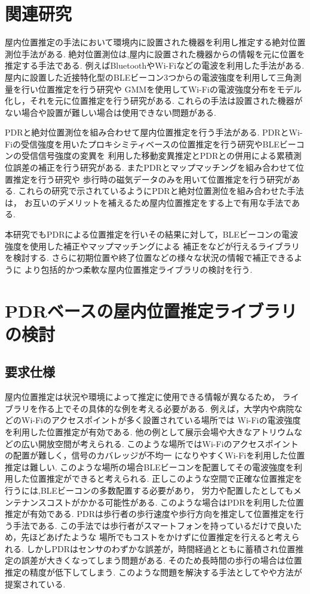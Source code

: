 
\section{関連研究}
屋内位置推定の手法において環境内に設置された機器を利用し推定する絶対位置測位手法がある.
絶対位置測位は,屋内に設置された機器からの情報を元に位置を推定する手法である.
例えばBluetoothやWi-Fiなどの電波を利用した手法がある.
屋内に設置した近接特化型のBLEビーコン3つからの電波強度を利用して三角測量を行い位置推定を行う研究\cite{ble-indoor}や
GMMを使用してWi-Fiの電波強度分布をモデル化し，それを元に位置推定を行う研究\cite{wifi-gmm}がある.
これらの手法は設置された機器がない場合や設置が難しい場合は使用できない問題がある.

PDRと絶対位置測位を組み合わせて屋内位置推定を行う手法がある.
PDRとWi-Fiの受信強度を用いたプロキシミティベースの位置推定を行う研究\cite{pdr-wifi}やBLEビーコンの受信信号強度の変異を
利用した移動変異推定とPDRとの併用による累積測位誤差の補正を行う研究\cite{pdr-ble}がある.
またPDRとマップマッチングを組み合わせて位置推定を行う研究\cite{pdr-map}や
歩行時の磁気データのみを用いて位置推定を行う研究\cite{pdr-mag}がある.
これらの研究で示されているようにPDRと絶対位置測位を組み合わせた手法は，
お互いのデメリットを補えるため屋内位置推定をする上で有用な手法である.

本研究でもPDRによる位置推定を行いその結果に対して，BLEビーコンの電波強度を使用した補正やマップマッチングによる
補正をなどが行えるライブラリを検討する.
さらに初期位置や終了位置などの様々な状況の情報で補正できるように
より包括的かつ柔軟な屋内位置推定ライブラリの検討を行う.

\section{PDRベースの屋内位置推定ライブラリの検討}

\subsection{要求仕様}

屋内位置推定は状況や環境によって推定に使用できる情報が異なるため，
ライブラリを作る上でその具体的な例を考える必要がある.
例えば，大学内や病院などのWi-Fiのアクセスポイントが多く設置されている場所では
Wi-Fiの電波強度を利用した位置推定が有効である.
他の例として展示会場や大きなアトリウムなどの広い開放空間が考えられる.
このような場所ではWi-Fiのアクセスポイントの配置が難しく，信号のカバレッジが不均一
になりやすくWi-Fiを利用した位置推定は難しい.
このような場所の場合BLEビーコンを配置してその電波強度を利用した位置推定ができると考えられる.
正しこのような空間で正確な位置推定を行うには,BLEビーコンの多数配置する必要があり，
労力や配置したとしてもメンテナンスコストがかかる可能性がある.
このような場合はPDRを利用した位置推定が有効である.
PDRは歩行者の歩行速度や歩行方向を推定して位置推定を行う手法である.
この手法では歩行者がスマートフォンを持っているだけで良いため，先ほどあげたような
場所でもコストをかけずに位置推定を行えると考えられる.
しかしPDRはセンサのわずかな誤差が，時間経過とともに蓄積され位置推定の誤差が大きくなってしまう問題がある.
そのため長時間の歩行の場合は位置推定の精度が低下してしまう.
このような問題を解決する手法として\cite{pdr-wifi}や\cite{pdr-ble}や方法が提案されている.

